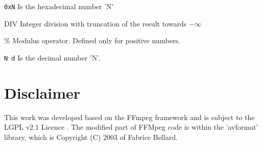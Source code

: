 \documentclass[
	12pt,				%
	openright,			%
	twoside,			%
	a4paper,			%
	brazil,
	french,				%
	english
	]{abntex2}
\begin{document}
\listoffigures*
\cleardoublepage

\listoftables*
\cleardoublepage





\begin{simbolos}
  \item[\texttt{0xN}] Is the hexadecimal number 'N'
  \item[DIV] Integer division with truncation of the result towards $-\infty$
  \item[\%] Modulus operator. Defined only for positive numbers.
  \item[\texttt{N d}] Is the decimal number 'N'.
\end{simbolos}

\tableofcontents*
\cleardoublepage



\textual

\chapter*[Disclaimer]{Disclaimer}

This work was developed based on the FFmpeg\cite{ffmpeg} framework and is subject to the LGPL v2.1 Licence \cite{gplv2}. The modified part of FFMpeg code is within the 'avformat' library, which is Copyright (C) 2003 of Fabrice Bellard. 
\end{document}
